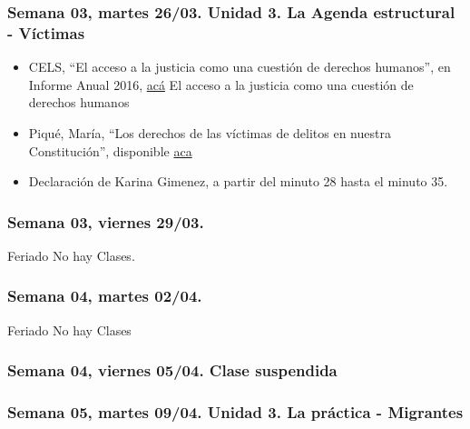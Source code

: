 \documentclass[
]{article}
\begin{document}
\hypertarget{semana-03-martes-2603.-unidad-3.-la-agenda-estructural---vuxedctimas}{%
\subsubsection{Semana 03, martes 26/03. Unidad 3. La Agenda estructural
-
Víctimas}\label{semana-03-martes-2603.-unidad-3.-la-agenda-estructural---vuxedctimas}}

\begin{itemize}
\item
  CELS, ``El acceso a la justicia como una cuestión de derechos
  humanos'', en Informe Anual 2016,
  \href{https://drive.google.com/file/d/1qH6DsnHctmesy6nje2f5NgCyowQ0PkyM/view?usp=sharing}{acá}
  El acceso a la justicia como una cuestión de derechos humanos
\item
  Piqué, María, ``Los derechos de las víctimas de delitos en nuestra
  Constitución'', disponible
  \href{https://drive.google.com/file/d/1NaUqgIjcAosZx6OCPuJzcdG3sbKrqfaC/view?usp=sharing}{aca}
\item
  Declaración de Karina Gimenez, a partir del minuto 28 hasta el minuto
  35.
\end{itemize}

\hypertarget{semana-03-viernes-2903.}{%
\subsubsection{Semana 03, viernes
29/03.}\label{semana-03-viernes-2903.}}

Feriado No hay Clases.

\hypertarget{semana-04-martes-0204.}{%
\subsubsection{Semana 04, martes 02/04.}\label{semana-04-martes-0204.}}

Feriado No hay Clases

\hypertarget{semana-04-viernes-0504.-clase-suspendida}{%
\subsubsection{Semana 04, viernes 05/04. Clase
suspendida}\label{semana-04-viernes-0504.-clase-suspendida}}

\hypertarget{semana-05-martes-0904.-unidad-3.-la-pruxe1ctica---migrantes}{%
\subsubsection{Semana 05, martes 09/04. Unidad 3. La práctica -
Migrantes}\label{semana-05-martes-0904.-unidad-3.-la-pruxe1ctica---migrantes}}
\end{document}
